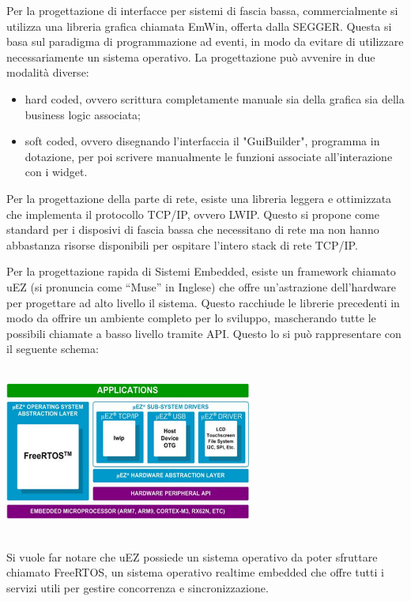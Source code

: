 \documentclass[journal]{IEEEtran}
\begin{document}
Per la progettazione di interfacce per sistemi di fascia bassa, commercialmente si utilizza una libreria grafica chiamata EmWin, offerta dalla SEGGER. Questa si basa sul paradigma di programmazione ad eventi, in modo da evitare di utilizzare necessariamente un sistema operativo. La progettazione può avvenire in due modalità diverse:

\begin{itemize}
\item hard coded, ovvero scrittura completamente manuale sia della grafica sia della business logic associata;
\item soft coded, ovvero disegnando l'interfaccia il "GuiBuilder", programma in dotazione, per poi scrivere manualmente le funzioni associate all'interazione con i widget.  
\end{itemize}

Per la progettazione della parte di rete, esiste una libreria leggera e ottimizzata che implementa il protocollo TCP/IP, ovvero LWIP. Questo si propone come standard per i disposivi di fascia bassa che necessitano di rete ma non hanno abbastanza risorse disponibili per ospitare l'intero stack di rete TCP/IP. 

Per la progettazione rapida di Sistemi Embedded, esiste un framework chiamato uEZ (si pronuncia come ``Muse'' in Inglese) che offre un'astrazione dell'hardware per progettare ad alto livello il sistema. Questo racchiude le librerie precedenti in modo da offrire un ambiente completo per lo sviluppo, mascherando tutte le possibili chiamate a basso livello tramite API. Questo lo si può rappresentare con il seguente schema:

\includegraphics[width=3.2in,height=2.2in,clip,keepaspectratio]{uEZ.png}

Si vuole far notare che uEZ possiede un sistema operativo da poter sfruttare chiamato FreeRTOS, un sistema operativo realtime embedded che offre tutti i servizi utili per gestire concorrenza e sincronizzazione.
\end{document}

